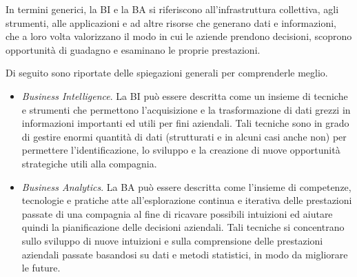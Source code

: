 In termini generici, la BI e la BA si riferiscono all'infrastruttura collettiva, agli strumenti, alle applicazioni e ad altre risorse che generano dati e informazioni, che a loro volta valorizzano il modo in cui le aziende prendono decisioni, scoprono opportunità di guadagno e esaminano le proprie prestazioni.\cite{hpe_bi_and_a}

Di seguito sono riportate delle spiegazioni generali per comprenderle meglio.\cite{academiaedu_bi_and_ba}

\begin{itemize}
    \item \textit{Business Intelligence}. La BI può essere descritta come un insieme di tecniche e strumenti che permettono l'acquisizione e la trasformazione di dati grezzi in informazioni importanti ed utili per fini aziendali. Tali tecniche sono in grado di gestire enormi quantità di dati (strutturati e in alcuni casi anche non) per permettere l'identificazione, lo sviluppo e la creazione di nuove opportunità strategiche utili alla compagnia.
    \item \textit{Business Analytics}. La BA può essere descritta come l'insieme di competenze, tecnologie e pratiche atte all'esplorazione continua e iterativa delle prestazioni passate di una compagnia al fine di ricavare possibili intuizioni ed aiutare quindi la pianificazione delle decisioni aziendali. Tali tecniche si concentrano sullo sviluppo di nuove intuizioni e sulla comprensione delle prestazioni aziendali passate basandosi su dati e metodi statistici, in modo da migliorare le future.
\end{itemize}